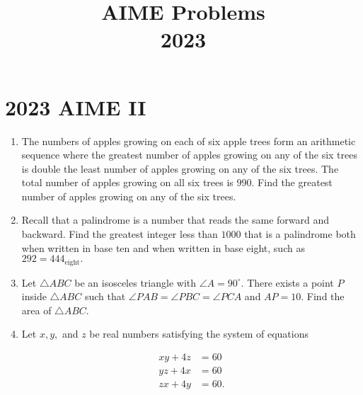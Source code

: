 \documentclass{article}
\title{AIME Problems \\ 2023}
\date{}
\begin{document}
\maketitle\thispagestyle{fancy}\newpage\section*{2023 AIME II}\begin{enumerate}[label=\arabic*., itemsep=0.5em]\item The numbers of apples growing on each of six apple trees form an arithmetic sequence where the greatest number of apples growing on any of the six trees is double the least number of apples growing on any of the six trees. The total number of apples growing on all six trees is \(990.\) Find the greatest number of apples growing on any of the six trees.\par \vspace{0.5em}\item Recall that a palindrome is a number that reads the same forward and backward. Find the greatest integer less than \(1000\) that is a palindrome both when written in base ten and when written in base eight, such as \(292 = 444_{\text{eight}}.\)\par \vspace{0.5em}\item Let \(\triangle ABC\) be an isosceles triangle with \(\angle A = 90^\circ.\) There exists a point \(P\) inside \(\triangle ABC\) such that \(\angle PAB = \angle PBC = \angle PCA\) and \(AP = 10.\) Find the area of \(\triangle ABC.\)\par \vspace{0.5em}\item Let \(x,y,\) and \(z\) be real numbers satisfying the system of equations

\begin{align*}
xy + 4z &= 60 \\
yz + 4x &= 60 \\
zx + 4y &= 60.
\end{align*}


\end{enumerate}
\end{document}

